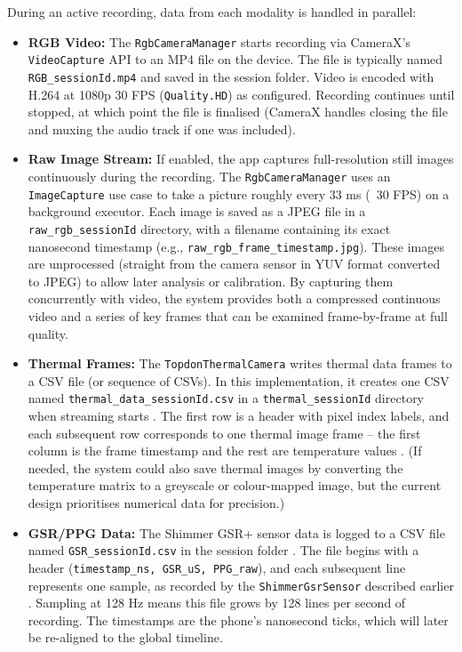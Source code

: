 During an active recording, data from each modality is handled in parallel:
\begin{itemize}
    \item \textbf{RGB Video:} The \texttt{RgbCameraManager} starts recording via CameraX's \texttt{VideoCapture} API to an MP4 file on the device. The file is typically named \texttt{RGB\_\<sessionId\>.mp4} and saved in the session folder. Video is encoded with H.264 at 1080p 30 FPS (\texttt{Quality.HD}) as configured. Recording continues until stopped, at which point the file is finalised (CameraX handles closing the file and muxing the audio track if one was included).
    \item \textbf{Raw Image Stream:} If enabled, the app captures full-resolution still images continuously during the recording. The \texttt{RgbCameraManager} uses an \texttt{ImageCapture} use case to take a picture roughly every 33 ms (~30 FPS) on a background executor. Each image is saved as a JPEG file in a \texttt{raw\_rgb\_\<sessionId\>} directory, with a filename containing its exact nanosecond timestamp (e.g., \texttt{raw\_rgb\_frame\_\<timestamp\>.jpg}). These images are unprocessed (straight from the camera sensor in YUV format converted to JPEG) to allow later analysis or calibration. By capturing them concurrently with video, the system provides both a compressed continuous video and a series of key frames that can be examined frame-by-frame at full quality.
    \item \textbf{Thermal Frames:} The \texttt{TopdonThermalCamera} writes thermal data frames to a CSV file (or sequence of CSVs). In this implementation, it creates one CSV named \texttt{thermal\_data\_\<sessionId\>.csv} in a \texttt{thermal\_\<sessionId\>} directory when streaming starts \cite{ref16}. The first row is a header with pixel index labels, and each subsequent row corresponds to one thermal image frame -- the first column is the frame timestamp and the rest are temperature values \cite{ref16}. (If needed, the system could also save thermal images by converting the temperature matrix to a greyscale or colour-mapped image, but the current design prioritises numerical data for precision.)
    \item \textbf{GSR/PPG Data:} The Shimmer GSR+ sensor data is logged to a CSV file named \texttt{GSR\_\<sessionId\>.csv} in the session folder \cite{ref15}. The file begins with a header (\texttt{timestamp\_ns, GSR\_uS, PPG\_raw}), and each subsequent line represents one sample, as recorded by the \texttt{ShimmerGsrSensor} described earlier \cite{ref15}. Sampling at 128 Hz means this file grows by 128 lines per second of recording. The timestamps are the phone's nanosecond ticks, which will later be re-aligned to the global timeline.

\end{itemize}
